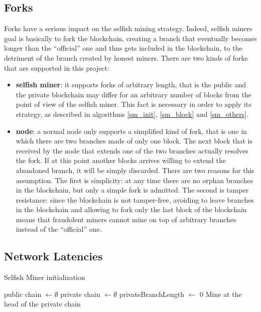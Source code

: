 \documentclass{article}
\begin{document}
\subsection{Forks} 
Forks have a serious impact on the selfish mining strategy. Indeed, selfish miners goal is basically to fork the blockchain, creating a branch that eventually becomes longer than the ``official'' one and thus gets included in the blockchain, to the detriment of the branch created by honest miners. There are two kinds of forks that are supported in this project:
\begin{itemize}
\item \textbf{selfish miner}: it supports forks of arbitrary length, that is the public and the private blockchain may differ for an arbitrary number of blocks from the point of view of the selfish miner. This fact is necessary in order to apply its strategy, as described in algorithms \ref{sm_init}, \ref{sm_block} and \ref{sm_others}.
\item{\textbf{node}}: a normal node only supports a simplified kind of fork, that is one in which there are two branches made of only one block. The next block that is received by the node that extends one of the two branches actually resolves the fork. If at this point another blocks arrives willing to extend the abandoned branch, it will be simply discarded. There are two reasons for this assumption. The first is simplicity: at any time there are no orphan branches in the blockchain, but only a simple fork is admitted. The second is tamper resistance: since the blockchain is not tamper-free, avoiding to leave branches in the blockchain and allowing to fork only the last block of the blockchain means that fraudolent miners cannot mine on top of arbitrary branches instead of the ``official'' one.  
\end{itemize}

\subsection{Network Latencies} 

\begin{algorithm}
\caption{Selfish Miner initialization}\label{sm_init}
\begin{algorithmic}[1]
\State public chain $\gets \emptyset$
\State private chain $\gets \emptyset$
\State privateBranchLength $\gets$ 0
\State Mine at the head of the private chain 
\end{algorithmic}
\end{algorithm}
\end{document}
